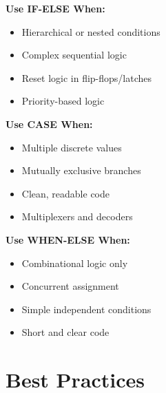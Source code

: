 \documentclass[12pt,a4paper]{article}
\begin{document}
\textbf{Use IF-ELSE When:}
\begin{itemize}
    \item Hierarchical or nested conditions
    \item Complex sequential logic
    \item Reset logic in flip-flops/latches
    \item Priority-based logic
\end{itemize}

\textbf{Use CASE When:}
\begin{itemize}
    \item Multiple discrete values
    \item Mutually exclusive branches
    \item Clean, readable code
    \item Multiplexers and decoders
\end{itemize}

\textbf{Use WHEN-ELSE When:}
\begin{itemize}
    \item Combinational logic only
    \item Concurrent assignment
    \item Simple independent conditions
    \item Short and clear code
\end{itemize}

\newpage
\section{Best Practices}
\end{document}
